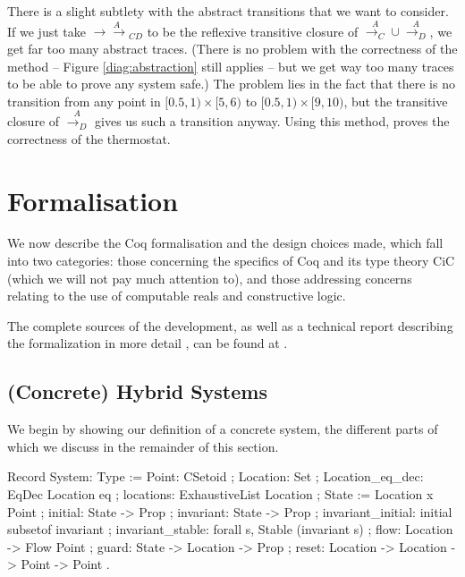 \documentclass[runningheads]{llncs}
\newcommand{\ADAM}[1] {\todo{\textsc{Adam says}: #1}}
\newcommand{\doubleheadrightarrow}{\mathrel{\rightarrow\!\!\!\!\rightarrow}}
\newcommand{\attrans}{\stackrel{A}{\doubleheadrightarrow_{CD}}}
\newcommand{\acontrans}{\stackrel{A}{\rightarrow_C}}
\newcommand{\adistrans}{\stackrel{A}{\rightarrow_D}}
\begin{document}
There is a slight subtlety with the abstract transitions that we want
to consider. If we just take $\attrans$ to be the reflexive transitive
closure of $\acontrans \cup \adistrans$, we get far too many abstract
traces. (There is no problem with the correctness of the method --
Figure \ref{diag:abstraction} still applies -- but we get way too many
traces to be able to prove any system safe.) The problem lies in the
fact that there is no transition from any point in $[0.5,1)
  \times[5,6)$ to $[0.5,1) \times[9,10)$, but the transitive closure
        of $\adistrans$ gives us such a transition anyway. 
Using this method, \cite{alur} proves the correctness of the thermostat. 

\section{Formalisation}
We now describe the Coq formalisation and the design choices made, which fall into two categories: those concerning the specifics of Coq and its type theory CiC (which we will not pay much attention to), and those addressing concerns relating to the use of computable reals and  constructive logic.

The complete sources of the development, as well as a technical report describing the formalization in more detail \cite{hybrid-techreport}, can be found at .

\subsection{(Concrete) Hybrid Systems}
\label{concrete}

We begin by showing our definition of a concrete system, the different
parts of which we discuss in the remainder of this section.

\begin{code}
Record System: Type :=
  { Point: CSetoid
  ; Location: Set
  ; Location_eq_dec: EqDec Location eq
  ; locations: ExhaustiveList Location
  ; State :=  Location x Point
  ; initial: State -> Prop
  ; invariant: State -> Prop
  ; invariant_initial: initial subsetof invariant
  ; invariant_stable: forall s, Stable (invariant s)
  ; flow: Location -> Flow Point
  ; guard: State -> Location -> Prop
  ; reset: Location -> Location -> Point -> Point  }.
\end{code}
\end{document}
